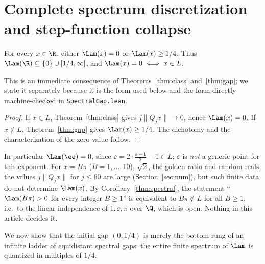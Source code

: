 \section{Complete spectrum discretization and step-function collapse}\label{sec:spectrum}

\begin{corollary}\label{thm:spectral}
For every $x\in\R$, either $\Lam(x)=0$ or $\Lam(x)\ge1/4$. Thus
$\Lam(\R)\subseteq\{0\}\cup[1/4,\infty]$, and $\Lam(x)=0\iff x\in L$.
\end{corollary}

This is an immediate consequence of Theorems~\ref{thm:class}
and~\ref{thm:gap}; we state it separately because it is the form used
below and the form directly machine-checked in \texttt{SpectralGap.lean}.

\begin{proof}
If $x\in L$, Theorem~\ref{thm:class} gives $j\|Q_jx\|\to0$, hence $\Lam(x)=0$.
If $x\notin L$, Theorem~\ref{thm:gap} gives $\Lam(x)\ge1/4$. The dichotomy and
the characterization of the zero value follow.
\end{proof}

\begin{remark}\label{rem:linear-indep}
In particular $\Lam(\ee)=0$, since $\ee=2\cdot\frac{\ee+1}{2}-1\in L$; $\ee$ is
\emph{not} a generic point for this exponent. For $x=B\pi$ ($B=1,\dots,10$),
$\sqrt2$, the golden ratio and random reals, the values $j\|Q_jx\|$ for
$j\le60$ are large (Section~\ref{sec:num}), but such finite data do not
determine $\Lam(x)$. By Corollary~\ref{thm:spectral}, the statement
``$\Lam(B\pi)>0$ for every integer $B\ge1$'' is equivalent to
$B\pi\notin L$ for all $B\ge1$, i.e.\ to the linear independence of
$1,\ee,\pi$ over $\Q$, which is open. Nothing in this article decides it.
\end{remark}

We now show that the initial gap $(0,1/4)$ is merely the bottom rung of an
infinite ladder of equidistant spectral gaps: the entire finite spectrum of
$\Lam$ is quantized in multiples of $1/4$.


